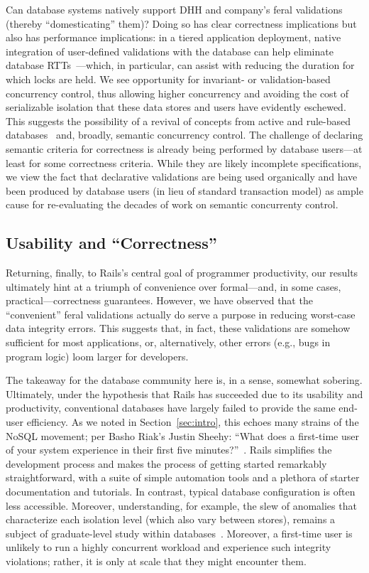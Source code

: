 Can database systems natively support DHH and company's feral
validations (thereby ``domesticating'' them)?  Doing so has clear
correctness implications but also has performance implications: in a
tiered application deployment, native integration of user-defined
validations with the database can help eliminate database
RTTs~\cite{pyxis}---which, in particular, can assist with reducing the
duration for which locks are held. We see opportunity for invariant-
or validation-based concurrency control, thus allowing higher
concurrency and avoiding the cost of serializable isolation that these
data stores and users have evidently eschewed. This suggests the
possibility of a revival of concepts from active and rule-based
databases~\cite{activedb-book} and, broadly, semantic concurrency
control. The challenge of declaring semantic criteria for correctness
is already being performed by database users---at least for some
correctness criteria. While they are likely incomplete specifications,
we view the fact that declarative validations are being used
organically and have been produced by database users (in lieu of
standard transaction model) as ample cause for re-evaluating the
decades of work on semantic concurrenty control.


\subsection{Usability and ``Correctness''}

Returning, finally, to Rails's central goal of programmer
productivity, our results ultimately hint at a triumph of convenience
over formal---and, in some cases, practical---correctness
guarantees. However, we have observed that the ``convenient'' feral
validations actually do serve a purpose in reducing worst-case data
integrity errors. This suggests that, in fact, these validations are
somehow sufficient for most applications, or, alternatively, other
errors (e.g., bugs in program logic) loom larger for developers.

The takeaway for the database community here is, in a sense, somewhat
sobering. Ultimately, under the hypothesis that Rails has succeeded
due to its usability and productivity, conventional databases have
largely failed to provide the same end-user efficiency. As we noted in
Section~\ref{sec:intro}, this echoes many strains of the NoSQL
movement; per Basho Riak's Justin Sheehy: ``What does a first-time user of
your system experience in their first five
minutes?''~\cite{marcus-talk}. Rails simplifies the development
process and makes the process of getting started remarkably
straightforward, with a suite of simple automation tools and a
plethora of starter documentation and tutorials. In contrast, typical
database configuration is often less accessible. Moreover,
understanding, for example, the slew of anomalies that characterize
each isolation level (which also vary between stores), remains a
subject of graduate-level study within
databases~\cite{adya-isolation,hat-vldb}. Moreover, a first-time user
is unlikely to run a highly concurrent workload and experience such
integrity violations; rather, it is only at scale that they might
encounter them.

